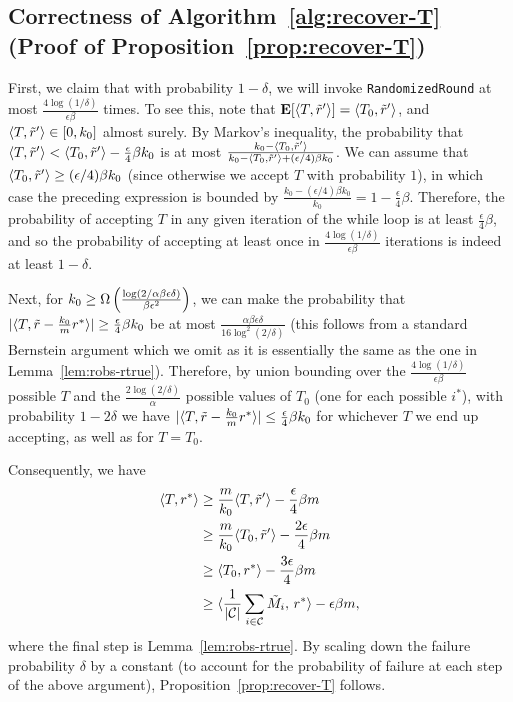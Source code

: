 \subsection{Correctness of Algorithm~\ref{alg:recover-T} (Proof of Proposition~\ref{prop:recover-T})}
\label{sec:recover-T-proof}

First, we claim that with probability $1-\delta$, we will invoke 
\texttt{RandomizedRound} at most $\frac{4\log(1/\delta)}{\epsilon\beta}$ times. 
To see this, note that $\mathbf{E}[\langle T, \tilde{r}' \rangle] = \langle T_0, \tilde{r}' \rangle$, and 
$\langle T, \tilde{r}' \rangle \in [0, k_0]$ almost surely. 
By Markov's inequality, the probability that 
$\langle T, \tilde{r}' \rangle < \langle T_0, \tilde{r}' \rangle - \frac{\epsilon}{4}\beta k_0$ is at most $\frac{k_0 - \langle T_0, \tilde{r}' \rangle}{k_0 - \langle T_0, \tilde{r}' \rangle + (\epsilon/4)\beta k_0}$. We can assume that 
$\langle T_0, \tilde{r}' \rangle \geq (\epsilon/4)\beta k_0$ (since otherwise 
we accept $T$ with probability $1$), in which case the preceding expression 
is bounded by 
$\frac{k_0 - (\epsilon/4)\beta k_0}{k_0} = 1 - \frac{\epsilon}{4}\beta$. 
Therefore, the probability of accepting $T$ in any given iteration of the while 
loop is at least $\frac{\epsilon}{4}\beta$, and so the probability of 
accepting at least once in $\frac{4\log(1/\delta)}{\epsilon\beta}$ iterations is 
indeed at least $1 - \delta$.

Next, for $k_0 \geq \Omega\left( \frac{\log(2/\alpha\beta\epsilon\delta)}{\beta \epsilon^2} \right)$, 
we can make the probability that $|\langle T, \tilde{r} - \frac{k_0}{m}r^* \rangle| \geq \frac{\epsilon}{4} \beta k_0$ be at most $\frac{\alpha\beta\epsilon\delta}{16\log^2(2/\delta)}$ (this follows from a standard Bernstein argument which we omit as it is essentially the same as the one 
in Lemma~\ref{lem:robs-rtrue}). 
Therefore, by union bounding over the $\frac{4\log(1/\delta)}{\epsilon\beta}$ 
possible $T$ and the $\frac{2\log(2/\delta)}{\alpha}$ possible values of $T_0$ (one for each possible $i^*$), 
with probability $1-2\delta$ we have $|\langle T, \tilde{r} - \frac{k_0}{m} r^* \rangle| \leq \frac{\epsilon}{4}\beta k_0$ for whichever $T$ we end up accepting, as well as for $T = T_0$.

Consequently, we have
\begin{align}
\langle T, r^* \rangle &\geq \frac{m}{k_0} \langle T, \tilde{r}' \rangle - \frac{\epsilon}{4}\beta m \\
 &\geq \frac{m}{k_0} \langle T_0, \tilde{r}' \rangle - \frac{2\epsilon}{4}\beta m \\
 &\geq \langle T_0, r^* \rangle - \frac{3\epsilon}{4}\beta m \\
 &\geq \langle \frac{1}{|\mathcal{C}|} \sum_{i \in \mathcal{C}} \tilde{M}_i,\, r^* \rangle - \epsilon\beta m,
\end{align}
where the final step is Lemma~\ref{lem:robs-rtrue}.
By scaling down the failure probability $\delta$ by a constant 
(to account for the probability of failure at each step of the above argument), 
Proposition~\ref{prop:recover-T} follows.
